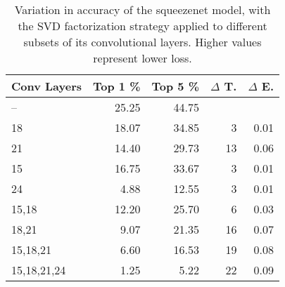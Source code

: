 \begin{table}
\centering
\begin{tabular}{|l|r|r|r|r|}
\hline
Conv Layers & Top 1 \% & Top 5 \% & $\Delta$ T. & $\Delta$ E. \\\hline
-- & 25.25 & 44.75 &  & \\\hline
18 & 18.07 & 34.85 & 3 & 0.01 \\\hline
21 & 14.40 & 29.73 & 13 & 0.06 \\\hline
15 & 16.75 & 33.67 & 3 & 0.01 \\\hline
24 & 4.88 & 12.55 & 3 & 0.01 \\\hline
15,18 & 12.20 & 25.70 & 6 & 0.03 \\\hline
18,21 & 9.07 & 21.35 & 16 & 0.07 \\\hline
15,18,21 & 6.60 & 16.53 & 19 & 0.08 \\\hline
15,18,21,24 & 1.25 & 5.22 & 22 & 0.09 \\\hline
\end{tabular}
\caption{Variation in accuracy of the squeezenet model, with the SVD factorization strategy applied to different subsets of its convolutional layers. Higher values represent lower loss.}
\label{squeezenet-accuracy}
\end{table}
